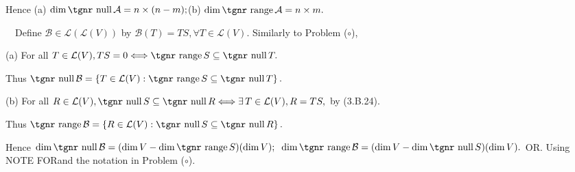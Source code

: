 \documentclass[a4paper, 11pt, UTF8]{article}
\def\range{{\textup{\tgnr range}}\,}
\def\null{{\textup{\tgnr null}}\,}
\def\Lm{\mathcal{L}}
\def\BulletPoint{{\small\bullet}}
\def\Ha{{\large\Blind{(a) }}}
\def\Hb{{\large\Blind{(b) }}}
\def\Or{{\large O{\footnotesize R.} }}
\def\NOTEFOR{{\tgnr\large N{\footnotesize OTE} F{\footnotesize OR}}}
\begin{document}
\begin{large}
Hence (a) $\dim\null \mathcal{A}=n\times(n-m);$\quad (b) $\dim\range \mathcal{A}=n\times m.$\PfEnd
\SepLine

\BulletPoint \,\hspace{1pt}\Comment\,\,\, {\Large\vspace{6pt}Define $\mathcal{B}\in\Lm\left(\Lm(V)\right)$ by $\mathcal{B}(T)=TS,\forall T\in\Lm(V).$ Similarly to Problem ($\circ$),}\par\quad
(a) {\Large\vspace{3pt}For all $T\in\Lm(V),TS=0\Longleftrightarrow\range S\subseteq\null T.$}\par\quad\Ha
{\Large\vspace{6pt}Thus $\null\mathcal{B}=\left\{T\in\Lm(V):\range S\subseteq\null T\right\}.$}\par\quad
(b) {\Large\vspace{3pt}For all $R\in\Lm(V),\null S\subseteq\null R\Longleftrightarrow\exists\,T\in\Lm(V),R=TS,$ by (3.B.24).}\par\quad\Hb
{\Large\vspace{6pt}Thus $\range\mathcal{B}=\left\{R\in\Lm(V):\null S\subseteq\null R\right\}.$}\par\quad
Hence $\dim\null\mathcal{B}=(\dim V-\dim\range S)(\dim V);\;\;\dim\range\mathcal{B}=(\dim V-\dim\null S)(\dim V).$\PfEnd\vspace{16pt}\quad
\Or Using \NOTEFOR\;[3.60] and the notation in Problem ($\circ$).\par
{\Large{}}\vspace{-70pt}\par\quad

\end{large}
\end{document}
